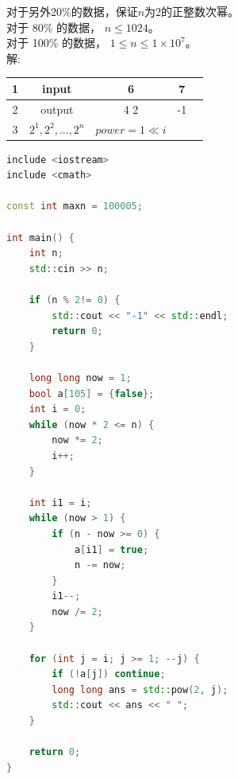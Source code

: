 \documentclass[12pt,twiside,a4paper]{ctexbook}
\numberwithin{chapter}{part}
\begin{document}
对于另外20\%的数据，保证$n$为2的正整数次幂。\\
对于 80\% 的数据， $n\leq 1024$。\\
对于 100\% 的数据， $1\leq n\leq 1\times10^7$。\\
解:\\
\begin{tabular}{|c|c|c|c|c|}
\hline
1 & input &6 & 7\\
\hline
2 & output & 4 2 & -1\\
\hline
3 & $2^1,2^2,...,2^n$ & $power = 1\ll i$& \\
\hline
\end{tabular}
\begin{lstlisting}[language=C++,breaklines=true]
include <iostream>
include <cmath>

const int maxn = 100005;

int main() {
    int n;
    std::cin >> n;

    if (n % 2!= 0) {
        std::cout << "-1" << std::endl;
        return 0;
    }

    long long now = 1;
    bool a[105] = {false};
    int i = 0;
    while (now * 2 <= n) {
        now *= 2;
        i++;
    }

    int i1 = i;
    while (now > 1) {
        if (n - now >= 0) {
            a[i1] = true;
            n -= now;
        }
        i1--;
        now /= 2;
    }

    for (int j = i; j >= 1; --j) {
        if (!a[j]) continue;
        long long ans = std::pow(2, j);
        std::cout << ans << " ";
    }

    return 0;
}
\end{lstlisting}
\end{document}
